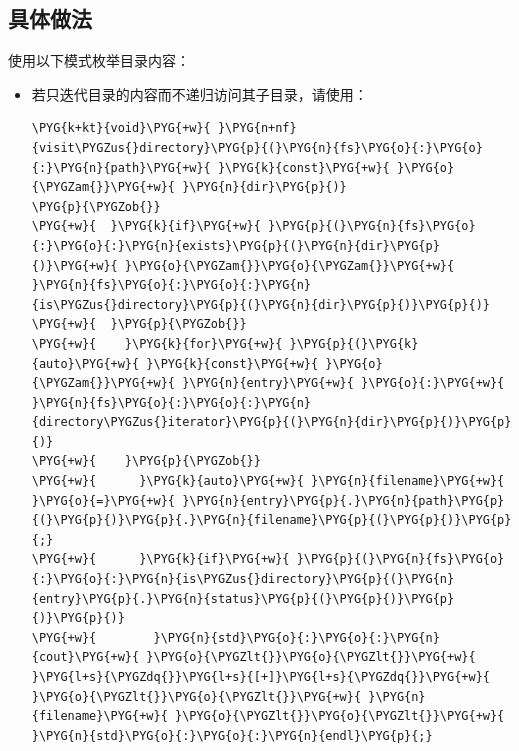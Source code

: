 
\subsection{具体做法}



使用以下模式枚举目录内容：



\begin{itemize}
\item 若只迭代目录的内容而不递归访问其子目录，请使用：



\begin{codeblockbg}
\begin{Verbatim}[commandchars=\\\{\},breaklines=true,breakanywhere=true,fontsize=\codefont,xleftmargin=17bp]
\PYG{k+kt}{void}\PYG{+w}{ }\PYG{n+nf}{visit\PYGZus{}directory}\PYG{p}{(}\PYG{n}{fs}\PYG{o}{:}\PYG{o}{:}\PYG{n}{path}\PYG{+w}{ }\PYG{k}{const}\PYG{+w}{ }\PYG{o}{\PYGZam{}}\PYG{+w}{ }\PYG{n}{dir}\PYG{p}{)}
\PYG{p}{\PYGZob{}}
\PYG{+w}{  }\PYG{k}{if}\PYG{+w}{ }\PYG{p}{(}\PYG{n}{fs}\PYG{o}{:}\PYG{o}{:}\PYG{n}{exists}\PYG{p}{(}\PYG{n}{dir}\PYG{p}{)}\PYG{+w}{ }\PYG{o}{\PYGZam{}}\PYG{o}{\PYGZam{}}\PYG{+w}{ }\PYG{n}{fs}\PYG{o}{:}\PYG{o}{:}\PYG{n}{is\PYGZus{}directory}\PYG{p}{(}\PYG{n}{dir}\PYG{p}{)}\PYG{p}{)}
\PYG{+w}{  }\PYG{p}{\PYGZob{}}
\PYG{+w}{    }\PYG{k}{for}\PYG{+w}{ }\PYG{p}{(}\PYG{k}{auto}\PYG{+w}{ }\PYG{k}{const}\PYG{+w}{ }\PYG{o}{\PYGZam{}}\PYG{+w}{ }\PYG{n}{entry}\PYG{+w}{ }\PYG{o}{:}\PYG{+w}{ }\PYG{n}{fs}\PYG{o}{:}\PYG{o}{:}\PYG{n}{directory\PYGZus{}iterator}\PYG{p}{(}\PYG{n}{dir}\PYG{p}{)}\PYG{p}{)}
\PYG{+w}{    }\PYG{p}{\PYGZob{}}
\PYG{+w}{      }\PYG{k}{auto}\PYG{+w}{ }\PYG{n}{filename}\PYG{+w}{ }\PYG{o}{=}\PYG{+w}{ }\PYG{n}{entry}\PYG{p}{.}\PYG{n}{path}\PYG{p}{(}\PYG{p}{)}\PYG{p}{.}\PYG{n}{filename}\PYG{p}{(}\PYG{p}{)}\PYG{p}{;}
\PYG{+w}{      }\PYG{k}{if}\PYG{+w}{ }\PYG{p}{(}\PYG{n}{fs}\PYG{o}{:}\PYG{o}{:}\PYG{n}{is\PYGZus{}directory}\PYG{p}{(}\PYG{n}{entry}\PYG{p}{.}\PYG{n}{status}\PYG{p}{(}\PYG{p}{)}\PYG{p}{)}\PYG{p}{)}
\PYG{+w}{        }\PYG{n}{std}\PYG{o}{:}\PYG{o}{:}\PYG{n}{cout}\PYG{+w}{ }\PYG{o}{\PYGZlt{}}\PYG{o}{\PYGZlt{}}\PYG{+w}{ }\PYG{l+s}{\PYGZdq{}}\PYG{l+s}{[+]}\PYG{l+s}{\PYGZdq{}}\PYG{+w}{ }\PYG{o}{\PYGZlt{}}\PYG{o}{\PYGZlt{}}\PYG{+w}{ }\PYG{n}{filename}\PYG{+w}{ }\PYG{o}{\PYGZlt{}}\PYG{o}{\PYGZlt{}}\PYG{+w}{ }\PYG{n}{std}\PYG{o}{:}\PYG{o}{:}\PYG{n}{endl}\PYG{p}{;}

\end{Verbatim}
\end{codeblockbg}
\end{itemize}
